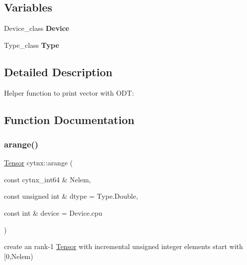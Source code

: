 \subsection*{Variables}
\begin{DoxyCompactItemize}
\item 
\mbox{\label{namespacecytnx_a0159aceab8996db3faf89716e4dd6b9a}} 
Device\+\_\+class {\bfseries Device}
\item 
\mbox{\label{namespacecytnx_ac2c6c045a5fd258e21bd0786744839c2}} 
Type\+\_\+class {\bfseries Type}
\end{DoxyCompactItemize}


\subsection{Detailed Description}
Helper function to print vector with O\+DT\+: 

\subsection{Function Documentation}
\mbox{\label{namespacecytnx_a733f9931141463bc8b7c61931ccf52c3}} 
\subsubsection{\texorpdfstring{arange()}{arange()}\hspace{0.1cm}{\footnotesize\ttfamily [1/2]}}
{\footnotesize\ttfamily \hyperlink{classcytnx_1_1Tensor}{Tensor} cytnx\+::arange (\begin{DoxyParamCaption}\item[{const cytnx\+\_\+int64 \&}]{Nelem,  }\item[{const unsigned int \&}]{dtype = {\ttfamily Type.Double},  }\item[{const int \&}]{device = {\ttfamily Device.cpu} }\end{DoxyParamCaption})}



create an rank-\/1 \hyperlink{classcytnx_1_1Tensor}{Tensor} with incremental unsigned integer elements start with \mbox{[}0,Nelem) 


